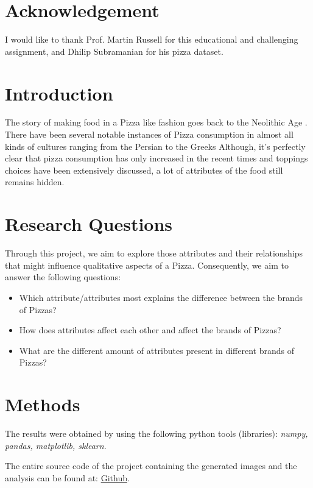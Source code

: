 \documentclass[preprint,12pt]{elsarticle}
\begin{document}
\section{Acknowledgement}
\label{s:acknowledge}
I would like to thank  Prof. Martin Russell for this educational and challenging assignment, and  Dhilip Subramanian for his pizza dataset.

\section{Introduction}
\label{s:introduction}
The story of making food in a Pizza like fashion goes back to the Neolithic Age \cite{pizzaOrigins1991}. There have been several
notable instances of Pizza consumption in almost all kinds of cultures ranging from the Persian to the Greeks \cite{Persian2014} \cite{Greek2000}
Although, it's perfectly clear that pizza consumption has only increased in the recent times and toppings choices have 
been extensively discussed, a lot of attributes of the food still remains hidden. 
\par
\section{Research Questions}
\label{s:ResearchQuestions}
Through this project, we aim to explore those attributes and their relationships that might influence qualitative aspects of a Pizza.
Consequently, we aim to answer the following questions:

\begin{itemize}
\item Which attribute/attributes most explains the difference between the brands of Pizzas?
\item How does attributes affect each other and affect the brands of Pizzas?
\item What are the different amount of attributes present in different brands of Pizzas?
\end{itemize}

\section{Methods}
\label{s:Methods}
The results were obtained by using the following python tools (libraries):  \textit{numpy, pandas, matplotlib, sklearn}. \cite{softwares}
\par
The entire source code of the project containing the generated images and the analysis can be found at: \href{https://github.com/amar-laksh/UNI/tree/master/assignments/IDA/assignment}{Github}.
\end{document}
